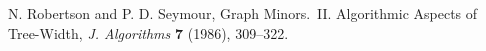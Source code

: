 \documentclass[11pt]{article}
\begin{document}
{\raggedright\noindent N. Robertson and P. D. Seymour, Graph Minors.\ II. Algorithmic Aspects of Tree-Width, \textit{J. Algorithms} \textbf{7} (1986), 309--322.
\par}\bigskip

\clearpage














\end{document}
